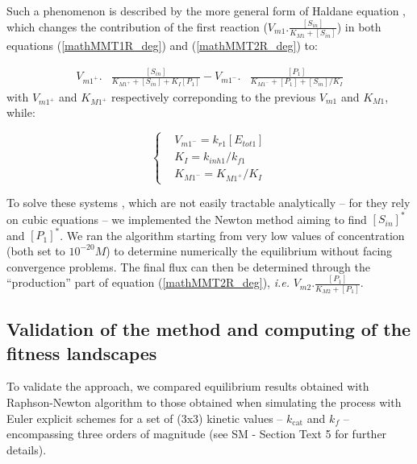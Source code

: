 \documentclass[11pt,onecolumn]{article}
\providecommand{\DIFdel}[1]{{\protect\color{red} \scriptsize #1}} %
\providecommand{\DIFaddbegin}{} %
\providecommand{\DIFaddend}{} %
\providecommand{\DIFdelbegin}{} %
\providecommand{\DIFdelend}{} %
\begin{document}
\DIFaddbegin \normalsize
\DIFaddend Such a phenomenon is described by the more general form of Haldane equation \citep{Haldane30,Cornish-Bowden79a}, which changes the contribution of the first reaction ($V_{m1}.\frac{[S_{in}]}{K_{M1}+[S_{in}]}$) in both equations (\ref{mathMMT1R_deg}) and (\ref{mathMMT2R_deg}) to:
\DIFaddbegin 

\DIFaddend \footnotesize
\begin{equation*}
		\begin{aligned}
		V_{m1^{+}}.&\frac{[S_{in}]}{K_{M1^{+}}+[S_{in}]+K_I [P_1]}-V_{m1^{-}}.&\frac{[P_1]}{K_{M1^{-}}+[P_1]+[S_{in}]/K_I}
		\end{aligned}
		\label{mathMMT1R_rev}
\end{equation*}
\normalsize
with $V_{m1^{+}}$ and $K_{M1^{+}}$ respectively correponding to the previous $V_{m1}$ and $K_{M1}$, while:
\DIFaddbegin 

\DIFaddend \small
\begin{equation*}
  \left\{
      \begin{aligned}
		&V_{m1^{-}}=k_{r1}[E_{tot1}]\\
		&K_I=k_{inh1}/k_{f1}\\
		&K_{M1^{-}}=K_{M1^{+}}/K_I
      \end{aligned}
    \right.
\end{equation*}
\DIFdelbegin %
\DIFdelend 

\DIFaddbegin \normalsize
\DIFaddend To solve these systems \DIFdelbegin \DIFdel{, which are not easily tractable analytically -- for they rely on cubic equations -- }\DIFdelend %
we implemented the Newton method \citep{Atkinson89} aiming to find $[S_{in}]^*$ and $[P_1]^*$. We ran the algorithm starting from very low values of concentration (both set to $10^{-20}M$) to determine numerically the equilibrium without facing convergence problems. The final flux can then be determined through the ``production'' part of equation (\ref{mathMMT2R_deg}), \textit{i.e.} $V_{m2}.\frac{[P_1]}{K_{M2}+[P_1]}$.


\subsection{Validation of the method and computing of the fitness landscapes}

To validate the approach, we compared equilibrium results obtained with Raphson-Newton algorithm to those obtained when simulating the process with Euler explicit schemes for a set of (3x3) kinetic values -- $k_\text{cat}$ and $k_f$ -- encompassing three orders of magnitude (see SM - Section Text 5 for further details).
\end{document}
